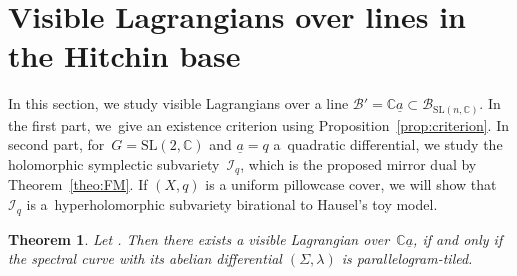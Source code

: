 \documentclass[pdftex]{sigma}
\numberwithin{equation}{section}
\newtheorem{theo}{Theorem}[section]
\theoremstyle{definition}
\newcommand{\reg}{\mathrm{reg}}
\newcommand{\calB}{\mathcal{B}}
\newcommand{\calI}{\mathcal{I}}
\newcommand{\CC}{\mathbb{C}}
\newcommand{\SL}{\mathrm{SL}}
\begin{document}
\section{Visible Lagrangians over lines in the Hitchin base}

In this section, we study visible Lagrangians over a line $\calB'=\CC \underline{a} \subset \calB_{\SL(n,\CC)}$. In the first part, we~give an existence criterion using Proposition~\ref{prop:criterion}. In second part, for~$G=\SL(2,\CC)$ and $\underline{a}=q$ a~quadratic differential, we study the holomorphic symplectic subvariety~$\calI_q$, which is the proposed mirror dual by Theorem~\ref{theo:FM}. If $(X,q)$ is a uniform pillowcase cover, we will show that~$\calI_q$ is a~hyperholomorphic subvariety birational to Hausel's toy model.

\begin{theo}\label{theo:visi_Lagr_over_line} Let \smash{$\underline{a}=(0,\dots,0,a_n) \in \calB_{\SL(n,\CC)}^\reg$}. Then there exists a visible Lagrangian over~$\CC \underline{a}$, if and only if the spectral curve with its abelian differential $(\Sigma,\lambda)$ is parallelogram-tiled.
\end{theo}
\end{document}
